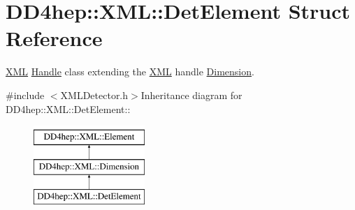 \hypertarget{struct_d_d4hep_1_1_x_m_l_1_1_det_element}{
\section{DD4hep::XML::DetElement Struct Reference}
\label{struct_d_d4hep_1_1_x_m_l_1_1_det_element}
}


\hyperlink{namespace_d_d4hep_1_1_x_m_l}{XML} \hyperlink{class_d_d4hep_1_1_handle}{Handle} class extending the \hyperlink{namespace_d_d4hep_1_1_x_m_l}{XML} handle \hyperlink{struct_d_d4hep_1_1_x_m_l_1_1_dimension}{Dimension}.  


{\ttfamily \#include $<$XMLDetector.h$>$}Inheritance diagram for DD4hep::XML::DetElement::\begin{figure}[H]
\begin{center}
\leavevmode
\includegraphics[height=3cm]{struct_d_d4hep_1_1_x_m_l_1_1_det_element}
\end{center}
\end{figure}

